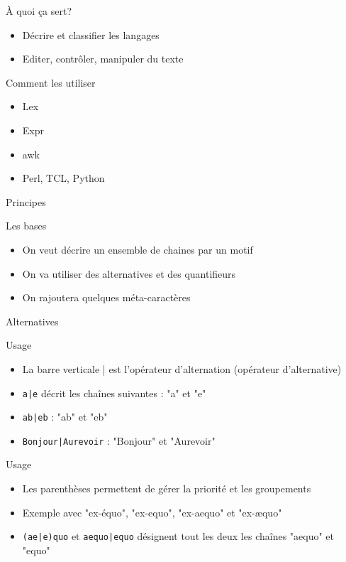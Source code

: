 \def\subsectitle{À quoi ça sert?}
\begin{frame}{\sectitle}
\begin{block}{\subsectitle}
\begin{itemize}
\item Décrire et classifier les langages
\item Editer, contrôler, manipuler du texte
\end{itemize}
\end{block}

\def\subsectitle{Comment les utiliser}
\begin{block}{\subsectitle}
\begin{itemize}
\item Lex
\item Expr
\item awk
\item Perl, TCL, Python
\end{itemize}
\end{block}
\end{frame}

\def\sectitle{Principes}
\def\subsectitle{Les bases}
\begin{frame}{\sectitle}
\begin{block}{\subsectitle}
\begin{itemize}
\item On veut décrire un ensemble de chaines par un motif
\item On va utiliser des alternatives et des quantifieurs
\item On rajoutera quelques méta-caractères
\end{itemize}
\end{block}
\end{frame}

\def\sectitle{Alternatives}
\def\subsectitle{Usage}
\begin{frame}[containsverbatim]{\sectitle}
\begin{block}{\subsectitle}
\begin{itemize}
\item La barre verticale | est l'opérateur d'alternation (opérateur d'alternative)
\item \verb!a|e! décrit les chaînes suivantes : "a" et "e"
\item \verb!ab|eb! : "ab" et "eb"
\item \verb!Bonjour|Aurevoir! : "Bonjour" et "Aurevoir"
\end{itemize}
\end{block}

\begin{block}{\subsectitle}
\begin{itemize}
\item Les parenthèses permettent de gérer la priorité et les groupements
\item Exemple avec "ex-équo", "ex-equo", "ex-aequo" et "ex-æquo" 
\item \verb!(ae|e)quo! et \verb!aequo|equo! désignent tout les deux les chaînes "aequo" et "equo"
\end{itemize}
\end{block}
\end{frame}



